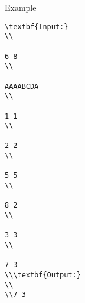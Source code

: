 Example
\begin{verbatim}
\textbf{Input:}
\\

6 8
\\

AAAABCDA
\\

1 1
\\

2 2
\\

5 5
\\

8 2
\\

3 3
\\

7 3
\\\textbf{Output:}
\\
\\7 3\end{verbatim}